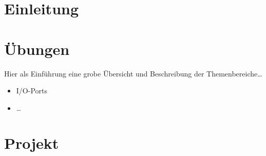 



\newcommand{\nr}{1}

\lstset{language=c}




\chapter*{Einleitung}


\chapter*{\"Ubungen}
Hier als Einf\"uhrung eine grobe \"Ubersicht und Beschreibung der Themenbereiche\ldots
\begin{itemize}
\item I/O-Ports
\item \ldots
\end{itemize}



\chapter*{Projekt}

